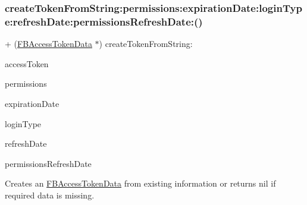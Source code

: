 \subsubsection{\texorpdfstring{create\+Token\+From\+String\+:permissions\+:expiration\+Date\+:login\+Type\+:refresh\+Date\+:permissions\+Refresh\+Date\+:()}{createTokenFromString:permissions:expirationDate:loginType:refreshDate:permissionsRefreshDate:()}\hspace{0.1cm}{\footnotesize\ttfamily [2/5]}}
{\footnotesize\ttfamily + (\hyperlink{interfaceFBAccessTokenData}{F\+B\+Access\+Token\+Data} $\ast$) create\+Token\+From\+String\+: \begin{DoxyParamCaption}\item[{(N\+S\+String $\ast$)}]{access\+Token }\item[{permissions:(N\+S\+Array $\ast$)}]{permissions }\item[{expirationDate:(N\+S\+Date $\ast$)}]{expiration\+Date }\item[{loginType:(F\+B\+Session\+Login\+Type)}]{login\+Type }\item[{refreshDate:(N\+S\+Date $\ast$)}]{refresh\+Date }\item[{permissionsRefreshDate:(N\+S\+Date $\ast$)}]{permissions\+Refresh\+Date }\end{DoxyParamCaption}}

Creates an \hyperlink{interfaceFBAccessTokenData}{F\+B\+Access\+Token\+Data} from existing information or returns nil if required data is missing.


